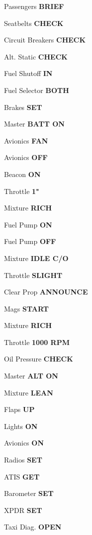 \documentclass{article}
\begin{document}
\begin{multicols*}{3}
Passengers \dotfill \textbf{BRIEF}

Seatbelts \dotfill \textbf{CHECK}

Circuit Breakers \dotfill \textbf{CHECK}

Alt. Static \dotfill \textbf{CHECK}

Fuel Shutoff \dotfill \textbf{IN}

Fuel Selector \dotfill \textbf{BOTH}

Brakes \dotfill \textbf{SET}

Master \dotfill \textbf{BATT ON}

Avionics \dotfill \textbf{FAN}

Avionics \dotfill \textbf{OFF}

Beacon \dotfill \textbf{ON}

\colorbox{orange!80}{}

Throttle \dotfill \textbf{1"}

Mixture \dotfill \textbf{RICH}

Fuel Pump \dotfill \textbf{ON}

Fuel Pump \dotfill \textbf{OFF}

\colorbox{orange!80}{}

Mixture \dotfill \textbf{IDLE C/O}

Throttle \dotfill \textbf{SLIGHT}

Clear Prop \dotfill \textbf{ANNOUNCE}

Mags \dotfill \textbf{START}

Mixture \dotfill \textbf{RICH}

Throttle \dotfill \textbf{1000 RPM}

Oil Pressure \dotfill \textbf{CHECK}

Master \dotfill \textbf{ALT ON}

Mixture \dotfill \textbf{LEAN}

Flaps \dotfill \textbf{UP}

Lights \dotfill \textbf{ON}

Avionics \dotfill \textbf{ON}

Radios \dotfill \textbf{SET}

ATIS \dotfill \textbf{GET}

Barometer \dotfill \textbf{SET}

XPDR \dotfill \textbf{SET}

Taxi Diag. \dotfill \textbf{OPEN}

\colorbox{green!80!red}{}


\end{multicols*}
\end{document}
